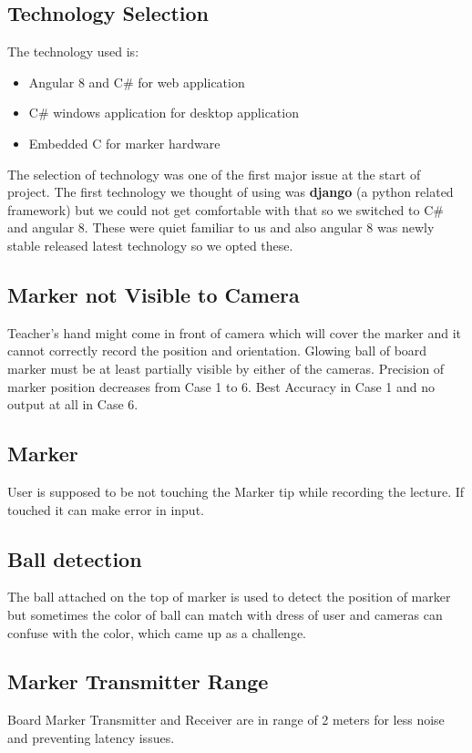 \subsection{Technology Selection}
The technology used is:
\begin{itemize}

\item Angular 8 and C\# for web application
\item C\# windows application for desktop application
\item Embedded C for marker hardware

\end{itemize}

The selection of technology was one of the first major issue at the start of project. The first technology we thought of using was \textbf{django} (a python related framework) but we could not get comfortable with that so we switched to C\# and angular 8. These were quiet familiar to us and also angular 8 was newly stable released latest technology so we opted these.
\bigskip


\subsection{Marker not Visible to Camera}
Teacher's hand might come in front of camera which will cover the marker and it cannot correctly record the position and orientation. Glowing ball of board marker must be at least partially visible by either of the cameras. Precision of marker position decreases from Case 1 to 6. Best Accuracy in Case 1 and no output at all in Case 6.
\bigskip

\subsection{Marker}
User is supposed to be not touching the Marker tip while recording the lecture. If touched it can make error in input.
\bigskip

\subsection{Ball detection}
The ball attached on the top of marker is used to detect the position of marker but sometimes the color of ball can match with dress of user and cameras can confuse with the color, which came up as a challenge.
\bigskip

\subsection{Marker Transmitter Range}
Board Marker Transmitter and Receiver are in range of 2 meters for less noise and preventing latency issues.
\bigskip

